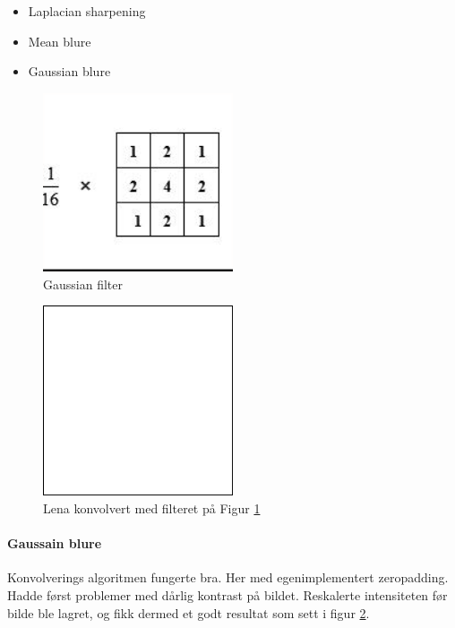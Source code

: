 \documentclass[a4paper, 12pt]{article}
\begin{document}
\begin{itemize}
   \item Laplacian sharpening
   \item Mean blure
   \item Gaussian blure
\end{itemize}

\begin{figure}[h]
  \centering
  \includegraphics[width=0.5\textwidth]{images/gaussian-filter}
  \caption{Gaussian filter}
  \label{fig:gaussian-filter}
\end{figure}

\begin{figure}[h]
  \centering
  \includegraphics[width=0.5\textwidth]{images/gaussian-blurred-lena}
  \caption{Lena konvolvert med filteret på Figur \ref{fig:gaussian-filter}}
  \label{fig:gaussian-blurred-lena}
\end{figure}

\paragraph{Gaussain blure} Konvolverings algoritmen fungerte bra. Her med egenimplementert zeropadding. Hadde først problemer med dårlig kontrast på bildet. Reskalerte intensiteten før bilde ble lagret, og fikk dermed et godt resultat som sett i figur \ref{fig:gaussian-blurred-lena}.
\end{document}
